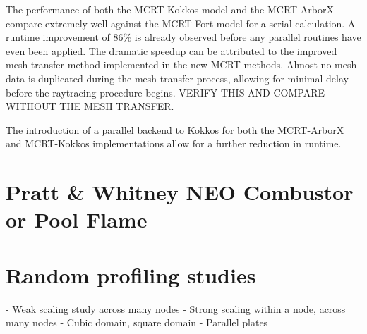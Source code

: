 The performance of both the MCRT-Kokkos model and the MCRT-ArborX compare extremely well against the MCRT-Fort model for a serial calculation. A runtime improvement of 86\% is already observed before any parallel routines have even been applied.
The dramatic speedup can be attributed to the improved mesh-transfer method implemented in the new MCRT methods. 
Almost no mesh data is duplicated during the mesh transfer process, allowing for minimal delay before the raytracing procedure begins. VERIFY THIS AND COMPARE WITHOUT THE MESH TRANSFER.

The introduction of a parallel backend to Kokkos for both the MCRT-ArborX and MCRT-Kokkos implementations allow for a further reduction in runtime.

\section{Pratt \& Whitney NEO Combustor or Pool Flame}


\section{Random profiling studies}
- Weak scaling study across many nodes
- Strong scaling within a node, across many nodes
    - Cubic domain, square domain
    - Parallel plates
    
